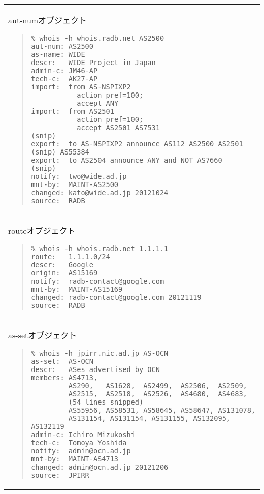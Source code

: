 \begin{tabular}{l}
\begin{itembox}[c]{aut-numオブジェクト}
\begin{quote}
\begin{minilinespace}
\begin{verbatim}
% whois -h whois.radb.net AS2500 
aut-num: AS2500
as-name: WIDE
descr:   WIDE Project in Japan
admin-c: JM46-AP
tech-c:  AK27-AP
import:  from AS-NSPIXP2
           action pref=100;
           accept ANY
import:  from AS2501
           action pref=100;
           accept AS2501 AS7531                     
(snip)
export:  to AS-NSPIXP2 announce AS112 AS2500 AS2501 (snip) AS55384
export:  to AS2504 announce ANY and NOT AS7660      
(snip)
notify:  two@wide.ad.jp
mnt-by:  MAINT-AS2500
changed: kato@wide.ad.jp 20121024
source:  RADB
\end{verbatim}
\end{minilinespace}
\end{quote}
\end{itembox}
\\
\begin{itembox}[c]{routeオブジェクト}
\begin{quote}
\begin{minilinespace}
\begin{verbatim}
% whois -h whois.radb.net 1.1.1.1
route:   1.1.1.0/24
descr:   Google
origin:  AS15169
notify:  radb-contact@google.com
mnt-by:  MAINT-AS15169
changed: radb-contact@google.com 20121119
source:  RADB
\end{verbatim}
\end{minilinespace}
\end{quote}
\end{itembox}
\\
\begin{itembox}[c]{as-setオブジェクト}
\begin{quote}
\begin{minilinespace}
\begin{verbatim}
% whois -h jpirr.nic.ad.jp AS-OCN
as-set:  AS-OCN
descr:   ASes advertised by OCN
members: AS4713,
         AS290,   AS1628,  AS2499,  AS2506,  AS2509,
         AS2515,  AS2518,  AS2526,  AS4680,  AS4683,
         (54 lines snipped)
         AS55956, AS58531, AS58645, AS58647, AS131078,
         AS131154, AS131154, AS131155, AS132095, AS132119
admin-c: Ichiro Mizukoshi
tech-c:  Tomoya Yoshida
notify:  admin@ocn.ad.jp
mnt-by:  MAINT-AS4713
changed: admin@ocn.ad.jp 20121206
source:  JPIRR
\end{verbatim}
\end{minilinespace}
\end{quote}
\end{itembox}

\end{tabular}

